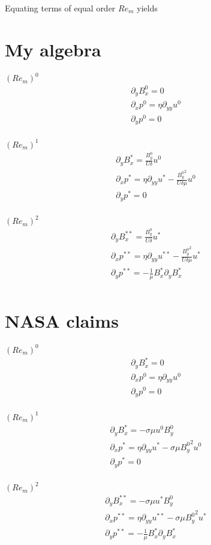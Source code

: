 \documentclass[11pt]{article}
\newcommand{\PD}{\partial}
\begin{document}
Equating terms of equal order $Re_m$ yields

\section{My algebra}

$(Re_m)^0$
\begin{equation}\begin{aligned}
\PD_{y} B_x^0 = 0 \\
\PD_x p^0 = \eta \PD_{yy} u^0 \\
\PD_y p^0 = 0 \\
\end{aligned} \end{equation}

$(Re_m)^1$
\begin{equation}\begin{aligned}
\PD_{y} B_x^* = \frac{B_y^0}{U \delta} u^0 \\
\PD_x p^* =   \eta \PD_{yy} u^* - \frac{{B_y^0}^2}{U \delta \mu} u^0 \\
\PD_y p^* = 0 \\
\end{aligned} \end{equation}

$(Re_m)^2$
\begin{equation}\begin{aligned}
\PD_y B_x^{**} = \frac{B_y^0}{U \delta} u^* \\
\PD_x p^{**} = \eta \PD_{yy} u^{**} - \frac{{B_y^0}^2}{U \delta \mu} u^* \\
\PD_y p^{**} = - \frac{1}{\mu} B_x^* \PD_y B_x^* \\
\end{aligned} \end{equation}


\section{NASA claims}
$(Re_m)^0$
\begin{equation}\begin{aligned}
\PD_{y} B_x^* = 0 \\
\PD_x p^0 = \eta \PD_{yy} u^0 \\
\PD_y p^0 = 0 \\
\end{aligned} \end{equation}

$(Re_m)^1$
\begin{equation}\begin{aligned}
\PD_{y} B_x^* = -\sigma \mu u^0 B_y^0 \\
\PD_x p^* = \eta \PD_{yy} u^* - \sigma \mu {B_y^0}^2 u^0 \\
\PD_y p^* = 0 \\
\end{aligned} \end{equation}

$(Re_m)^2$
\begin{equation}\begin{aligned}
\PD_{y} B_x^{**} = -\sigma \mu u^* B_y^0 \\
\PD_x p^{**} = \eta \PD_{yy} u^{**} - \sigma \mu {B_y^0}^2 u^* \\
\PD_y p^{**} = - \frac{1}{\mu} B_x^* \PD_y B_x^* \\
\end{aligned} \end{equation}
\end{document}

